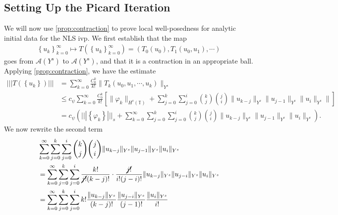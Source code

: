\documentclass[12pt,reqno]{amsart}
\numberwithin{equation}{section}  %
\numberwithin{figure}{section}
\newcommand{\ci}{\mathbb{T}}
\newcommand{\vp}{\varphi}
\theoremstyle{plain}
\theoremstyle{definition}
\theoremstyle{remark}
\begin{document}
\subsection{Setting Up the Picard Iteration}
We will now use \cref{prop:contraction} to prove local well-posedness for
analytic initial data for the NLS ivp. We first establish that the map 
%
%
\begin{equation*}
\begin{split}
  \left\{ u_k \right\}_{k=0}^{\infty} \mapsto T\left( \left\{ u_k
  \right\}_{k=0}^{\infty} \right) = \left( T_0(u_0), T_1(u_0, u_1), \cdots \right)
\end{split}
\end{equation*}
%
%
goes from $\mathcal{A}(Y^s)$ to $\mathcal{A}(Y^s)$, and that it is a contraction
in an appropriate ball.
%
Applying \cref{prop:contraction}, we have the estimate
%
%
\begin{equation}
\begin{split}
  | | |T(\left\{ u_{k} \right\}) | | |
  & = \sum_{k=0}^{\infty} \frac{C_0^k}{k!} \|T_{k}(u_0, u_1, \cdots, u_k)
  \|_{Y^s}
  \\
  & \le c_{\psi} \sum_{k=0}^{\infty} \frac{C_0^k}{k!}\left[ \| \vp_{k}
  \|_{H^s(\ci)} + \sum_{j=0}^{k} \sum_{j=0}^{i} {k \choose j } {j \choose i }
  \|u_{k-j}\|_{Y^s} \| u_{j-1}\|_{Y^s} \|u_{i} \|_{Y^s} \| \right]
  \\
  & = c_{\psi}\left( | | | \left\{ \vp_{k} \right\} | | |_{s} +
  \sum_{k=0}^{\infty} \sum_{j=0}^{k}
  \sum_{j=0}^{i} {k \choose j } {j \choose i }
  \|u_{k-j}\|_{Y^s} \| u_{j-1}\|_{Y^s} \| u_{i} \|_{Y^s}\right).
\end{split}
\label{eqn:map-onto-ball}
\end{equation}
%
%
We now rewrite the second term
%
%
\begin{equation*}
\begin{split}
  & \sum_{k=0}^{\infty} \sum_{j=0}^{k}  \sum_{j=0}^{i} {k \choose j } {j \choose i } \|u_{k-j}\|_{Y^s}
\| u_{j-1}\|_{Y^s} \| u_{i} \|_{Y^s} 
  \\
  & = \sum_{k=0}^{\infty} \sum_{j=0}^{k}  \sum_{j=0}^{i} \frac{k!}{\cancel{j!}(k-j)!}
  \cdot \frac{\cancel{j!}}{i!(j-i)!} \| u_{k-j} \|_{Y^s} \| u_{j-i} \|_{Y^s} \|
  u_{i} \|_{Y^s}
  \\
  & = \sum_{k=0}^{\infty} \sum_{j=0}^{k}  \sum_{j=0}^{i}  k! \frac{\|
  u_{k-j} \|_{Y^s}}{(k-j)!} \frac{\| u_{j-i} \|_{Y^s}}{(j-1)!} \frac{\|
  u_{i} \|_{Y^s}}{i!}
\end{split}
\end{equation*}
\end{document}
